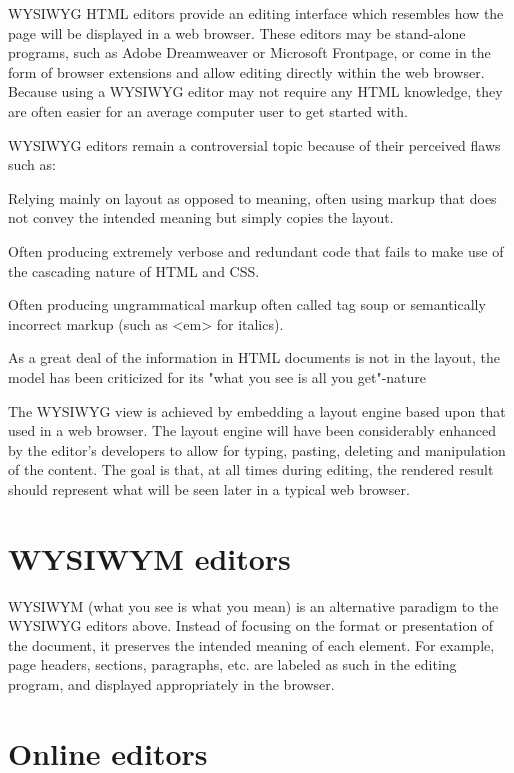 WYSIWYG HTML editors provide an editing interface which resembles how the page will be displayed in a web browser. These editors may be stand-alone programs, such as Adobe Dreamweaver or Microsoft Frontpage, or come in the form of browser extensions and allow editing directly within the web browser. Because using a WYSIWYG editor may not require any HTML knowledge, they are often easier for an average computer user to get started with.

WYSIWYG editors remain a controversial topic because of their perceived flaws such as:

\begin{compactitem}
\item Relying mainly on layout as opposed to meaning, often using markup that does not convey the intended meaning but simply copies the layout.
\item Often producing extremely verbose and redundant code that fails to make use of the cascading nature of HTML and CSS.
\item Often producing ungrammatical markup often called tag soup or semantically incorrect markup (such as <em> for italics).
\item As a great deal of the information in HTML documents is not in the layout, the model has been criticized for its "what you see is all you get"-nature
\end{compactitem}

The WYSIWYG view is achieved by embedding a layout engine based upon that used in a web browser. The layout engine will have been considerably enhanced by the editor's developers to allow for typing, pasting, deleting and manipulation of the content. The goal is that, at all times during editing, the rendered result should represent what will be seen later in a typical web browser.

\section{WYSIWYM editors}

WYSIWYM (what you see is what you mean) is an alternative paradigm to the WYSIWYG editors above. Instead of focusing on the format or presentation of the document, it preserves the intended meaning of each element. For example, page headers, sections, paragraphs, etc. are labeled as such in the editing program, and displayed appropriately in the browser.

\section{Online editors}

